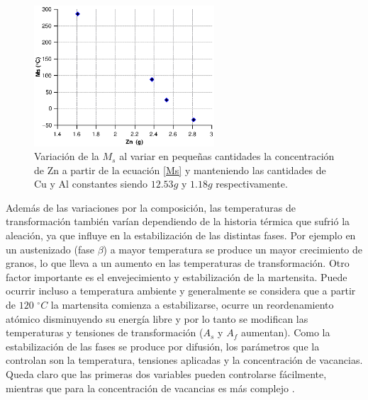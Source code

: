 \documentclass[a4paper,12pt,fleqn,twoside,openany]{book}
\begin{document}
\begin{figure}[h]
 \centering
 \includegraphics[width=0.6\textwidth]{Img/Introduccion/MsZn2.eps}
 \caption{Variación de la $M_s$ al variar en pequeñas cantidades la concentración de Zn a partir de la ecuación \ref{Ms} y manteniendo las cantidades de Cu y Al constantes siendo $12.53 g$ y $1.18 g$ respectivamente.}
 \label{fig:mstab}
\end{figure}


Además de las variaciones por la composición, las temperaturas de transformación también varían dependiendo de la historia térmica que sufrió la aleación, ya que influye en la estabilización 
de las distintas fases. Por ejemplo en un austenizado (fase $\beta$) a mayor temperatura se produce un mayor crecimiento de granos, lo que lleva a un aumento en las 
temperaturas de transformación. Otro factor importante es el envejecimiento y estabilización de la martensita. Puede ocurrir incluso a temperatura ambiente y generalmente se considera que a partir de $120$ $^\circ C $ la martensita comienza 
a estabilizarse, ocurre un reordenamiento atómico disminuyendo su energía libre y por lo tanto se modifican las temperaturas y tensiones de transformación ($A_s$ y $A_f$ aumentan). Como la estabilización 
de las fases se produce por difusión, los parámetros que la controlan son la temperatura, tensiones aplicadas y la concentración de vacancias. Queda claro que las 
primeras dos variables pueden controlarse fácilmente, mientras que para la concentración de vacancias es más complejo \cite{gibson}.
 
\end{document}
